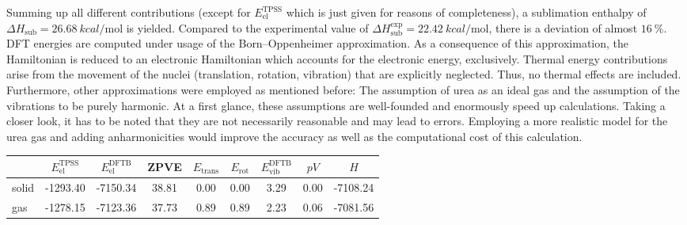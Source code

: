 \documentclass[a4paper,12pt]{scrartcl}
\begin{document}
Summing up all different contributions (except for $ E_\mathrm{el}^\mathrm{TPSS} $ which is just given for reasons of completeness), a sublimation enthalpy of $ \Delta H_\mathrm{sub} = \SI[]{26.68}{kcal\per\mole} $ is yielded. Compared to the experimental value of $ \Delta H_\mathrm{sub}^\mathrm{exp} = \SI[]{22.42}{kcal\per\mole} $, there is a deviation of almost $ \SI[]{16}{\percent} $. DFT energies are computed under usage of the Born--Oppenheimer approximation. As a consequence of this approximation, the Hamiltonian is reduced to an electronic Hamiltonian which accounts for the electronic energy, exclusively. Thermal energy contributions arise from the movement of the nuclei (translation, rotation, vibration) that are explicitly neglected. Thus, no thermal effects are included. Furthermore, other approximations were employed as mentioned before: The assumption of urea as an ideal gas and the assumption of the vibrations to be purely harmonic. At a first glance, these assumptions are well-founded and enormously speed up calculations. Taking a closer look, it has to be noted that they are not necessarily reasonable and may lead to errors. Employing a more realistic model for the urea gas and adding anharmonicities would improve the accuracy as well as the computational cost of this calculation.
%
\begin{table}
	\centering
	\label{tab:sublimation}
	\begin{tabular}{l|cccccccc}
		\toprule
		      & $ E_\mathrm{el}^\mathrm{TPSS} $ & $ E_\mathrm{el}^\mathrm{DFTB} $ & ZPVE  & $ E_\mathrm{trans} $ & $ E_\mathrm{rot} $ & $ E_\mathrm{vib}^\mathrm{DFTB} $ & $ pV $ & $ H $    \\
		\midrule
		solid & -1293.40                        & -7150.34                        & 38.81 & 0.00                 & 0.00               & 3.29                             & 0.00   & -7108.24 \\
		gas   & -1278.15                        & -7123.36                        & 37.73 & 0.89                 & 0.89               & 2.23                             & 0.06   & -7081.56 \\

		\bottomrule
	\end{tabular}
\end{table}
%
\newpage
\printbibliography[title={Literature}]
%
\end{document}
